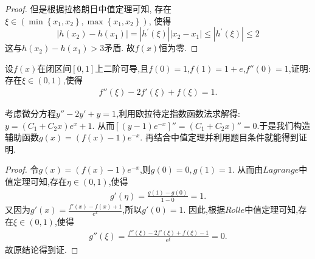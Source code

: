 \documentclass[../../main.tex]{subfiles}%
\begin{document}
\begin{proof}
但是根据拉格朗日中值定理可知,
存在$\xi \in \left( \min \left\{ x_1,x_2 \right\} ,\max \left\{ x_1,x_2 \right\} \right)$,
使得
\begin{equation}
\left| h\left( x_2 \right) -h\left( x_1 \right) \right|=\left| h^{\prime}\left( \xi \right) \right|\left| x_2-x_1 \right|\leqslant \left| h^{\prime}\left( \xi \right) \right|\leqslant 2
\nonumber
\end{equation}
这与$h(x_2)-h(x_1)>3$矛盾.
故$f(x)$恒为零.
\end{proof}

\begin{example}
设\(f(x)\)在闭区间\([0,1]\)上二阶可导,且\(f(0)=1\),\(f(1)=1 + e\),\(f''(0)=1\),证明:存在\(\xi\in(0,1)\),使得
\begin{align*}
f''(\xi)-2f'(\xi)+f(\xi)=1.
\nonumber
\end{align*}
\end{example}
\begin{note}
考虑微分方程$y''-2y'+y=1$,利用欧拉待定指数函数法求解得:$y=(C_1+C_2x)e^x+1$.
从而$[(y-1)e^{-x}]''=(C_1+C_2x)''=0$.于是我们构造辅助函数$g(x)=(f(x)-1)e^{-x}$.
再结合中值定理并利用题目条件就能得到证明.
\end{note}
\begin{proof}
令$g(x)=(f(x)-1)e^{-x}$,则$g(0)=0,g(1)=1$.
从而由$Lagrange$中值定理可知,存在$\eta\in(0,1)$,使得
\begin{align*}
g'(\eta)=\frac{g(1)-g(0)}{1-0}=1.
\nonumber
\end{align*}
又因为$g'(x)=\frac{f'\left( x \right) -f\left( x \right) +1}{e^x}$,所以$g'(0)=1$.
因此,根据$Rolle$中值定理可知,存在$\xi\in(0,1)$,使得
\begin{align*}
g''\left( \xi \right) =\frac{f''\left( \xi \right) -2f'\left( \xi \right) +f\left( \xi \right)-1}{e^{\xi}}=0.
\nonumber
\end{align*}
故原结论得到证.
\end{proof}
\end{document}
